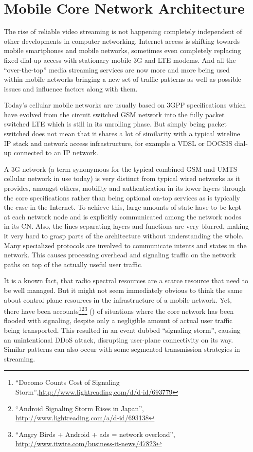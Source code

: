 \chapter{Mobile Core Network Architecture}
\label{chap:mobilenets}

The rise of reliable video streaming is not happening completely independent of other developments in computer networking. Internet access is shifting towards mobile smartphones and mobile networks, sometimes even completely replacing fixed dial-up access  with stationary mobile \gls{3G} and \gls{LTE} modems. And all the ``over-the-top'' media streaming services are now more and more being used within mobile networks bringing a new set of traffic patterns as well as possible issues and influence factors along with them.

Today's cellular mobile networks are usually based on \gls{3GPP} specifications which have evolved from the circuit switched \gls{GSM} network into the fully packet switched \gls{LTE} which is still in its unrolling phase. But simply being packet switched does not mean that it shares a lot of similarity with a typical wireline \gls{IP} stack and network access infrastructure, for example a \gls{VDSL} or \gls{DOCSIS} dial-up connected to an \gls{IP} network. 

A \gls{3G} network (a term synonymous for the typical combined \gls{GSM} and \gls{UMTS} cellular network in use today) is very distinct from typical wired networks as it provides, amongst others, mobility and authentication in its lower layers through the core specifications rather than being optional on-top services as is typically the case in the Internet. To achieve this, large amounts of state have to be kept at each network node and is explicitly communicated among the network nodes in its \gls{CN}. Also, the lines separating layers and functions are very blurred, making it very hard to grasp parts of the architecture without understanding the whole. Many specialized protocols are involved to communicate intents and states in the network. This causes processing overhead and signaling traffic on the network paths on top of the actually useful user traffic. 

It is a known fact, that radio spectral resources are a scarce resource that need to be well managed. But it might not seem immediately obvious to think the same about control plane resources in the infrastructure of a mobile network. Yet, there have been accounts\footnote{``Docomo Counts Cost of Signaling Storm'',\url{http://www.lightreading.com/d/d-id/693779}}\footnote{``Android Signaling Storm Rises in Japan'', \url{http://www.lightreading.com/a/d-id/693138}}\footnote{``Angry Birds + Android + ads = network overload'', \url{http://www.itwire.com/business-it-news/47823}} (\cite{huawei2011storm}) of situations where the core network has been flooded with signaling, despite only a negligible amount of actual user traffic being transported. This resulted in an event dubbed ``signaling storm'', causing an unintentional \gls{DDoS} attack, disrupting user-plane connectivity on its way. Similar patterns can also occur with some segmented transmission strategies in streaming.

